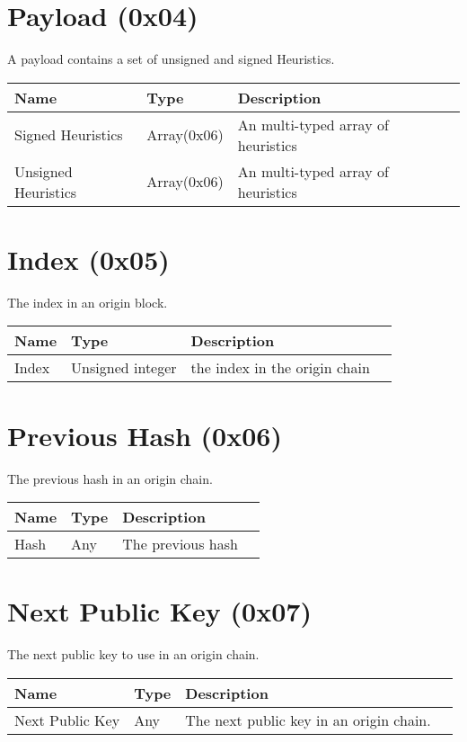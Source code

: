 \documentclass[11pt]{article}
\begin{document}
\section{Payload (0x04)}
A payload contains a set of unsigned and signed Heuristics.
\begin{center}
\begin{tabular}{ |l|l|l|l| } 
\hline
\textbf{Name} & \textbf{Type} & \textbf{Description}\\
\hline
Signed Heuristics & Array(0x06) & An multi-typed array of heuristics\\  
Unsigned Heuristics & Array(0x06) & An multi-typed array of heuristics\\  

 
\hline
\end{tabular}
\end{center}
\section{Index (0x05)}
The index in an origin block.
\begin{center}
\begin{tabular}{ |l|l|l|l| } 
\hline
\textbf{Name} & \textbf{Type} & \textbf{Description}\\
\hline
Index & Unsigned integer & the index in the origin chain\\  
\hline
\end{tabular}
\end{center}
\section{Previous Hash (0x06)}
The previous hash in an origin chain.
\begin{center}
\begin{tabular}{ |l|l|l|l| } 
\hline
\textbf{Name} & \textbf{Type} & \textbf{Description}\\
\hline
Hash & Any & The previous hash\\  
\hline
\end{tabular}
\end{center}
\section{Next Public Key (0x07)}
The next public key to use in an origin chain.
\begin{center}
\begin{tabular}{ |l|l|l|l| } 
\hline
\textbf{Name} & \textbf{Type} & \textbf{Description}\\
\hline
Next Public Key & Any & The next public key in an origin chain.\\  
\hline
\end{tabular}
\end{center}
\end{document}
